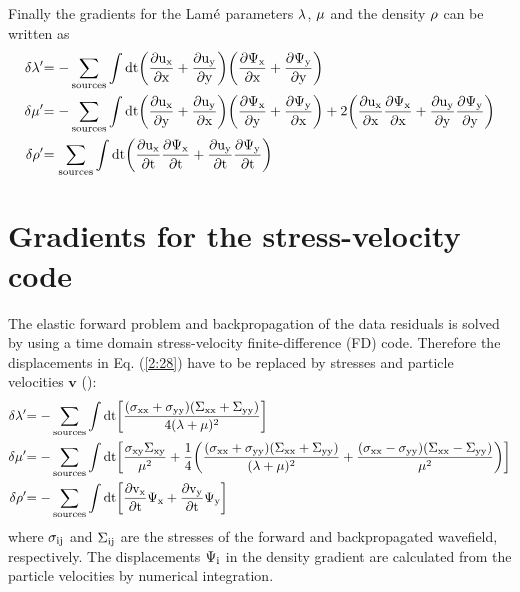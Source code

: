 Finally the gradients for the Lam$\rm{\acute{\rm e}}$ parameters $\rm{\lambda}$, $\rm{\mu}$ and the density $\rm{\rho}$ can be written as
\begin{equation}
\begin{split}
\rm{\delta \lambda'} & \rm{= - \sum_{sources} \int dt \biggl(\frac{\partial u_x}{\partial x}+\frac{\partial u_y}{\partial y}\biggr) 
                     \biggl(\frac{\partial \Psi_x}{\partial x}+\frac{\partial \Psi_y}{\partial y}\biggr)}\\
\rm{\delta \mu'} & \rm{= - \sum_{sources} \int dt \biggl(\frac{\partial u_x}{\partial y}+\frac{\partial u_y}{\partial x}\biggr) 
                                  \biggl(\frac{\partial \Psi_x}{\partial y}+\frac{\partial \Psi_y}{\partial x}\biggr) +
                                  2\biggl(\frac{\partial u_x}{\partial x} \frac{\partial \Psi_x}{\partial x} + \frac{\partial
				  u_y}{\partial y} \frac{\partial \Psi_y}{\partial y}\biggr)}\\
\rm{\delta \rho'} & \rm{= \sum_{sources} \int dt \biggl(\frac{\partial u_x}{\partial t}\frac{\partial \Psi_x}{\partial t} +
\frac{\partial u_y}{\partial t}\frac{\partial \Psi_y}{\partial t}\biggr)}\\
\end{split}
\label{2:28}
\end{equation}
\newpage
\section{Gradients for the stress-velocity code}\label{Gradients for the stress-velocity code}
The elastic forward problem and backpropagation of the data residuals is solved by using a time domain stress-velocity finite-difference (FD) code. Therefore the displacements in Eq. (\ref{2:28}) have to be replaced by stresses and particle velocities $\mathbf{v}$ (\cite{shipp:02}): 
\begin{equation}
\begin{split}
\rm{\delta \lambda'} &\rm{= - \sum_{sources} \int dt \biggl[\frac{(\sigma_{xx}+\sigma_{yy}) 
                     (\Sigma_{xx}+\Sigma_{yy})}{4(\lambda+\mu)^2} \biggr]}\\
\rm{\delta \mu'} &\rm{= - \sum_{sources} \int dt \biggl[\frac{\sigma_{xy} \Sigma_{xy}}{\mu^2}} + \frac{1}{4} \biggl(
\frac{(\sigma_{xx}+\sigma_{yy})(\Sigma_{xx}+\Sigma_{yy})}{(\lambda+\mu)^2} + \frac{(\sigma_{xx}-\sigma_{yy})(\Sigma_{xx}-\Sigma_{yy})}{\mu^2}\biggr)\biggr]\\
\rm{\delta \rho'} &\rm{= - \sum_{sources} \int dt \biggl[\frac{\partial v_x}{\partial t}\Psi_x + \frac{\partial v_y}{\partial t}\Psi_y\biggr]}\\
\end{split}
\label{2:28:1}
\end{equation}
where $\rm{\sigma_{ij}}$ and $\rm{\Sigma_{ij}}$ are the stresses of the forward and backpropagated wavefield, respectively. The displacements $\rm{\Psi_i}$ in the density gradient are calculated from the particle velocities by numerical integration.
 
